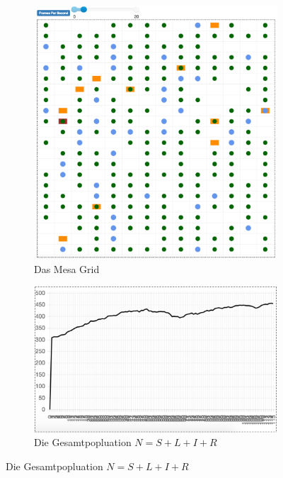 \documentclass[paper=a4, fontsize=11pt, ngerman, abstract=on]{scrartcl}
\numberwithin{equation}{section} %
\numberwithin{figure}{section} %
\numberwithin{table}{section} %
\begin{document}
\begin{figure}[ht]
  \centering
  \begin{subfigure}{.5\textwidth}
    \centering
    \includegraphics[width=.99\linewidth]{images/mesa-grid}
    \caption{Das Mesa Grid}
    \label{fig:mesa-grid}
  \end{subfigure}%
  \begin{subfigure}{.5\textwidth}
    \centering
    \includegraphics[width=.99\linewidth]{images/n-population}
    \caption{Die Gesamtpopluation $N = S + L + I + R$}
    \label{fig:n-population}
  \end{subfigure}
\end{figure}
\end{document}
